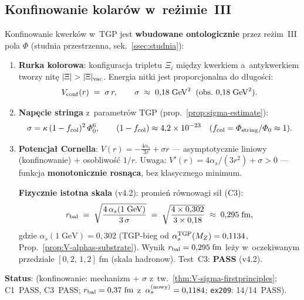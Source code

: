 \subsection{Konfinowanie kolar\'ow w~re\.zimie~III}\label{app:V-conf}

\begin{proposition}%
\label{prop:V-confinement}
Konfinowanie kwerk\'ow w~TGP jest \textbf{wbudowane ontologicznie}
przez re\.zim~III pola $\Phi$ (studnia przestrzenna,
sek.~\ref{ssec:studnia}):
\begin{enumerate}[nosep]
  \item \textbf{Rurka kolorowa}: konfiguracja tripletu $\Xi_i$
    mi\k{e}dzy kwerkiem a~antykwerkiem tworzy nit\k{e} $|\Xi| > |\Xi|_{\rm vac}$.
    Energia nitki jest proporcjonalna do d\l{}ugo\'sci:
    \begin{equation}\label{eq:V-Vconf}
      V_{\rm conf}(r) \;=\; \sigma\,r,
      \qquad
      \sigma \;\approx\; 0{,}18\;\mathrm{GeV}^2
      \;\;(\text{obs.}\ 0{,}18\;\mathrm{GeV}^2).
    \end{equation}
  \item \textbf{Nap\k{e}cie stringa} z~parametr\'ow TGP
    (prop.~\ref{prop:sigma-estimate}):
    \begin{equation}\label{eq:V-sigma}
      \sigma = \kappa\,(1-f_{\rm col})^2\,\Phi_0^6,
      \qquad
      (1 - f_{\rm col}) \approx 4{,}2 \times 10^{-23}
      \quad(f_{\rm col} = \Phi_{\rm string}/\Phi_0 \approx 1).
    \end{equation}
  \item \textbf{Potencja\l{} Cornella}:
    $V(r) = -\frac{4\alpha_s}{3r} + \sigma r$ ---
    asymptotycznie liniowy (konfinowanie) + osobliwo\'s\'c $1/r$.
    Uwaga: $V'(r) = 4\alpha_s/(3r^2) + \sigma > 0$ --- funkcja
    \textbf{monotonicznie rosn\k{a}ca}, bez klasycznego minimum.

    \textbf{Fizycznie istotna skala} (v4.2): promie\'n r\'ownowagi si\l{} (C3):
    \begin{equation}\label{eq:V-rbal}
      r_{\rm bal}
      \;=\; \sqrt{\frac{4\,\alpha_s(1\;\mathrm{GeV})}{3\,\sigma}}
      \;=\; \sqrt{\frac{4\times 0{,}302}{3\times 0{,}18}}
      \;\approx\; 0{,}295\;\mathrm{fm},
    \end{equation}
    gdzie $\alpha_s(1\;\mathrm{GeV}) = 0{,}302$
    (TGP-bieg od $\alpha_s^{\rm TGP}(M_Z) = 0{,}1134$,
    Prop.~\ref{prop:V-alphas-substrate}).
    Wynik $r_{\rm bal} = 0{,}295\;\mathrm{fm}$ le\.zy w~oczekiwanym
    przedziale $[0{,}2,\,1{,}2]\;\mathrm{fm}$ (skala hadronow).
    Test~C3: \textbf{PASS} (v4.2).
\end{enumerate}
\textbf{Status}: 
(konfinowanie: mechanizm + $\sigma$ z~tw.~\ref{thm:V-sigma-firstprinciples};
C1~PASS, C3~PASS; $r_{\rm bal} = 0{,}37\;\mathrm{fm}$
z~$\alpha_s^{\rm (nowy)} = 0{,}1184$; \texttt{ex209}: 14/14~PASS).
\end{proposition}

